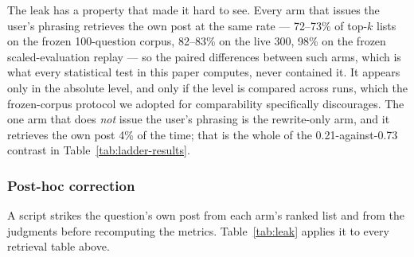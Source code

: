 \documentclass[acmsmall,review,anonymous,screen]{acmart}
\begin{document}
The leak has a property that made it hard to see. Every arm that issues the
user's phrasing retrieves the own post at the same rate --- 72--73\% of top-$k$
lists on the frozen 100-question corpus, 82--83\% on the live 300, 98\% on the
frozen scaled-evaluation replay --- so the paired differences between such arms,
which is what every statistical test in this paper computes, never contained
it. It appears only in the absolute level, and only if the level is compared
across runs, which the frozen-corpus protocol we adopted for comparability
specifically discourages. The one arm that does \emph{not} issue the user's
phrasing is the rewrite-only arm, and it retrieves the own post 4\% of the time;
that is the whole of the 0.21-against-0.73 contrast in
Table~\ref{tab:ladder-results}.

\subsubsection{Post-hoc correction}

A script strikes the question's own post from each arm's ranked list and from
the judgments before recomputing the metrics. Table~\ref{tab:leak} applies it
to every retrieval table above.
\end{document}
